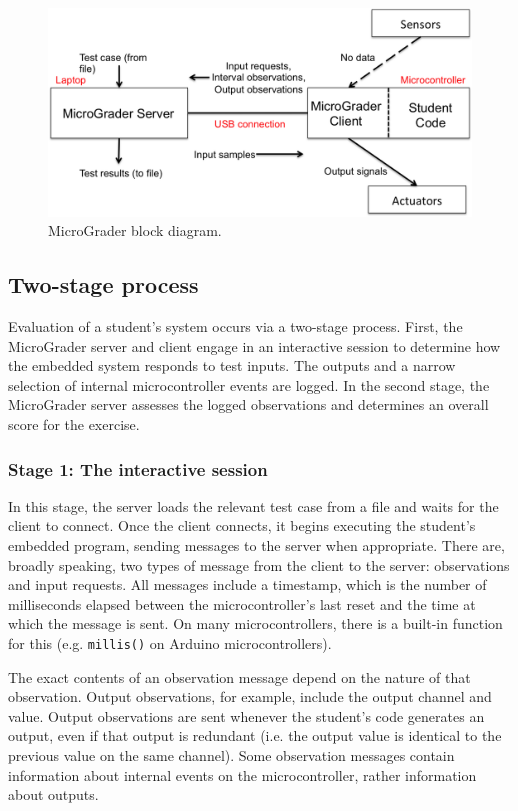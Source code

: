 \documentclass[12pt]{article}
\begin{document}
\begin{figure}[h]
\centering
\includegraphics[width=\linewidth]{test-mode.png}
\caption{MicroGrader block diagram.}
\label{fig:test-mode}
\end{figure}

\subsection{Two-stage process}
Evaluation of a student's system occurs via a two-stage process.  First, the MicroGrader server and client engage in an interactive session to determine how the embedded system responds to test inputs.  The outputs and a narrow selection of internal microcontroller events are logged.  In the second stage, the MicroGrader server assesses the logged observations and determines an overall score for the exercise.

\subsubsection{Stage 1: The interactive session}
In this stage, the server loads the relevant test case from a file and waits for the client to connect.  Once the client connects, it begins executing the student's embedded program, sending messages to the server when appropriate.  There are, broadly speaking, two types of message from the client to the server: observations and input requests.  All messages include a timestamp, which is the number of milliseconds elapsed between the microcontroller's last reset and the time at which the message is sent.  On many microcontrollers, there is a built-in function for this (e.g. \texttt{millis()} on Arduino microcontrollers).

The exact contents of an observation message depend on the nature of that observation.  Output observations, for example, include the output channel and value.  Output observations are sent whenever the student's code generates an output, even if that output is redundant (i.e. the output value is identical to the previous value on the same channel).  Some observation messages contain information about internal events on the microcontroller, rather information about outputs.
\end{document}
